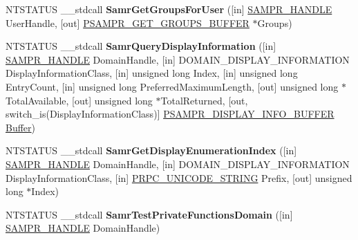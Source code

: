 \begin{DoxyCompactItemize}
\item 
\mbox{\label{interfacesamr_a0e65e807b3487b2615a24325ce704480}} 
N\+T\+S\+T\+A\+T\+US \+\_\+\+\_\+stdcall {\bfseries Samr\+Get\+Groups\+For\+User} (\mbox{[}in\mbox{]} \hyperlink{interfacevoid}{S\+A\+M\+P\+R\+\_\+\+H\+A\+N\+D\+LE} User\+Handle, \mbox{[}out\mbox{]} \hyperlink{struct___s_a_m_p_r___g_e_t___g_r_o_u_p_s___b_u_f_f_e_r}{P\+S\+A\+M\+P\+R\+\_\+\+G\+E\+T\+\_\+\+G\+R\+O\+U\+P\+S\+\_\+\+B\+U\+F\+F\+ER} $\ast$Groups)
\item 
\mbox{\label{interfacesamr_a9ef3416cf1611c07e0cf9aa02657f01f}} 
N\+T\+S\+T\+A\+T\+US \+\_\+\+\_\+stdcall {\bfseries Samr\+Query\+Display\+Information} (\mbox{[}in\mbox{]} \hyperlink{interfacevoid}{S\+A\+M\+P\+R\+\_\+\+H\+A\+N\+D\+LE} Domain\+Handle, \mbox{[}in\mbox{]} D\+O\+M\+A\+I\+N\+\_\+\+D\+I\+S\+P\+L\+A\+Y\+\_\+\+I\+N\+F\+O\+R\+M\+A\+T\+I\+ON Display\+Information\+Class, \mbox{[}in\mbox{]} unsigned long Index, \mbox{[}in\mbox{]} unsigned long Entry\+Count, \mbox{[}in\mbox{]} unsigned long Preferred\+Maximum\+Length, \mbox{[}out\mbox{]} unsigned long $\ast$Total\+Available, \mbox{[}out\mbox{]} unsigned long $\ast$Total\+Returned, \mbox{[}out, switch\+\_\+is(Display\+Information\+Class)\mbox{]} \hyperlink{union___s_a_m_p_r___d_i_s_p_l_a_y___i_n_f_o___b_u_f_f_e_r}{P\+S\+A\+M\+P\+R\+\_\+\+D\+I\+S\+P\+L\+A\+Y\+\_\+\+I\+N\+F\+O\+\_\+\+B\+U\+F\+F\+ER} \hyperlink{class_buffer}{Buffer})
\item 
\mbox{\label{interfacesamr_aafcac7bbee317f5c501f1ebed4432a50}} 
N\+T\+S\+T\+A\+T\+US \+\_\+\+\_\+stdcall {\bfseries Samr\+Get\+Display\+Enumeration\+Index} (\mbox{[}in\mbox{]} \hyperlink{interfacevoid}{S\+A\+M\+P\+R\+\_\+\+H\+A\+N\+D\+LE} Domain\+Handle, \mbox{[}in\mbox{]} D\+O\+M\+A\+I\+N\+\_\+\+D\+I\+S\+P\+L\+A\+Y\+\_\+\+I\+N\+F\+O\+R\+M\+A\+T\+I\+ON Display\+Information\+Class, \mbox{[}in\mbox{]} \hyperlink{struct___r_p_c___u_n_i_c_o_d_e___s_t_r_i_n_g}{P\+R\+P\+C\+\_\+\+U\+N\+I\+C\+O\+D\+E\+\_\+\+S\+T\+R\+I\+NG} Prefix, \mbox{[}out\mbox{]} unsigned long $\ast$Index)
\item 
\mbox{\label{interfacesamr_af8cfb295dac8f2d732e5089312eec171}} 
N\+T\+S\+T\+A\+T\+US \+\_\+\+\_\+stdcall {\bfseries Samr\+Test\+Private\+Functions\+Domain} (\mbox{[}in\mbox{]} \hyperlink{interfacevoid}{S\+A\+M\+P\+R\+\_\+\+H\+A\+N\+D\+LE} Domain\+Handle)
\item 

\end{DoxyCompactItemize}
